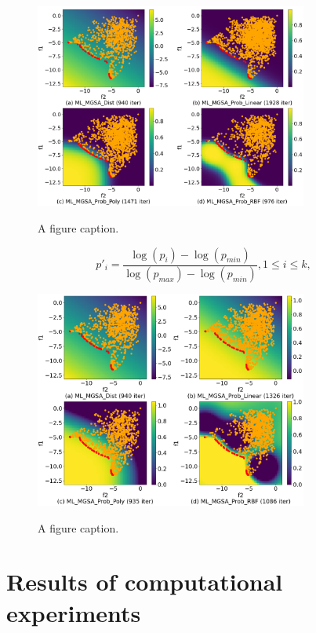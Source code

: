 \documentclass[runningheads]{llncs}
\begin{document}
\begin{figure}
\center
\includegraphics[width=0.8\textwidth]{fig1.png}
\label{fig1}
\caption{A figure caption.} 
\end{figure}



\begin{equation}
    \label{eq:18}
p'_i= \frac{ \log (p_i) - \log (p_{min})}{ \log (p_{max}) - \log (p_{min})} , 1 \leq i \leq k,
\end{equation}

\begin{figure}
\center
\includegraphics[width=0.8\textwidth]{fig2.png}
\label{fig2}
\caption{A figure caption.} 
\end{figure}


\section{Results of computational experiments}
\label{sec:5}
\end{document}
